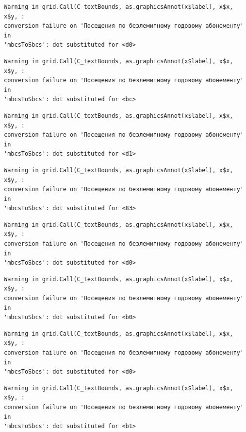 \documentclass[
  letterpaper,
  DIV=11,
  numbers=noendperiod]{scrartcl}
\begin{document}
\begin{verbatim}
Warning in grid.Call(C_textBounds, as.graphicsAnnot(x$label), x$x, x$y, :
conversion failure on 'Посещения по безлемитному годовому абонементу' in
'mbcsToSbcs': dot substituted for <d0>
\end{verbatim}

\begin{verbatim}
Warning in grid.Call(C_textBounds, as.graphicsAnnot(x$label), x$x, x$y, :
conversion failure on 'Посещения по безлемитному годовому абонементу' in
'mbcsToSbcs': dot substituted for <bc>
\end{verbatim}

\begin{verbatim}
Warning in grid.Call(C_textBounds, as.graphicsAnnot(x$label), x$x, x$y, :
conversion failure on 'Посещения по безлемитному годовому абонементу' in
'mbcsToSbcs': dot substituted for <d1>
\end{verbatim}

\begin{verbatim}
Warning in grid.Call(C_textBounds, as.graphicsAnnot(x$label), x$x, x$y, :
conversion failure on 'Посещения по безлемитному годовому абонементу' in
'mbcsToSbcs': dot substituted for <83>
\end{verbatim}

\begin{verbatim}
Warning in grid.Call(C_textBounds, as.graphicsAnnot(x$label), x$x, x$y, :
conversion failure on 'Посещения по безлемитному годовому абонементу' in
'mbcsToSbcs': dot substituted for <d0>
\end{verbatim}

\begin{verbatim}
Warning in grid.Call(C_textBounds, as.graphicsAnnot(x$label), x$x, x$y, :
conversion failure on 'Посещения по безлемитному годовому абонементу' in
'mbcsToSbcs': dot substituted for <b0>
\end{verbatim}

\begin{verbatim}
Warning in grid.Call(C_textBounds, as.graphicsAnnot(x$label), x$x, x$y, :
conversion failure on 'Посещения по безлемитному годовому абонементу' in
'mbcsToSbcs': dot substituted for <d0>
\end{verbatim}

\begin{verbatim}
Warning in grid.Call(C_textBounds, as.graphicsAnnot(x$label), x$x, x$y, :
conversion failure on 'Посещения по безлемитному годовому абонементу' in
'mbcsToSbcs': dot substituted for <b1>
\end{verbatim}
\end{document}
